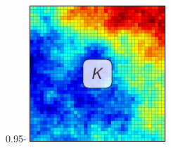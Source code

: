 \begin{frame}{\name{}}
\begin{overlayarea}{\textwidth}{\frameheight}
\begin{columns}
\begin{column}{0.95\textwidth - \cw}
{                    \includegraphics[width = \textwidth]{figures/perm/perm.pdf}
                }%
            \end{column}
        \end{columns}
    \end{overlayarea}
\end{frame}

